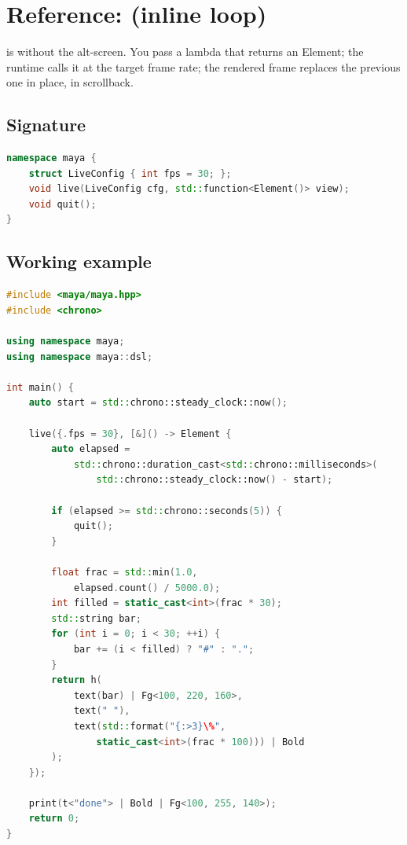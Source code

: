 \chapter{Reference:  (inline loop)}
\label{ch:refman-live}

\begin{aside}
 is  without the alt-screen.
You pass a lambda that returns an Element; the runtime calls
it at the target frame rate; the rendered frame replaces
the previous one in place, in scrollback.
\end{aside}

\section{Signature}

\begin{lstlisting}[language=C++]
namespace maya {
    struct LiveConfig { int fps = 30; };
    void live(LiveConfig cfg, std::function<Element()> view);
    void quit();
}
\end{lstlisting}

\section{Working example}

\begin{lstlisting}[language=C++]
#include <maya/maya.hpp>
#include <chrono>

using namespace maya;
using namespace maya::dsl;

int main() {
    auto start = std::chrono::steady_clock::now();

    live({.fps = 30}, [&]() -> Element {
        auto elapsed =
            std::chrono::duration_cast<std::chrono::milliseconds>(
                std::chrono::steady_clock::now() - start);

        if (elapsed >= std::chrono::seconds(5)) {
            quit();
        }

        float frac = std::min(1.0,
            elapsed.count() / 5000.0);
        int filled = static_cast<int>(frac * 30);
        std::string bar;
        for (int i = 0; i < 30; ++i) {
            bar += (i < filled) ? "#" : ".";
        }
        return h(
            text(bar) | Fg<100, 220, 160>,
            text(" "),
            text(std::format("{:>3}\%",
                static_cast<int>(frac * 100))) | Bold
        );
    });

    print(t<"done"> | Bold | Fg<100, 255, 140>);
    return 0;
}
\end{lstlisting}

